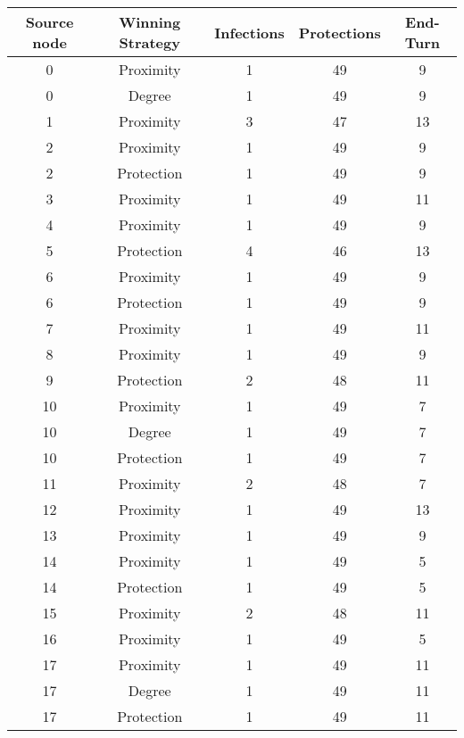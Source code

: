 \documentclass[results.tex]{subfiles}
\begin{document}
\begin{center}
  \begin{tabular}{| c || c | c | c | c |}
    \hline
    {\bfseries Source node} & {\bfseries Winning Strategy} & {\bfseries Infections} & {\bfseries Protections} & {\bfseries End-Turn} \\  %
    \hline\hline
    0 & Proximity & 1 & 49 & 9 \\ 
    \hline
    0 & Degree & 1 & 49 & 9 \\ 
    \hline
    1 & Proximity & 3 & 47 & 13 \\ 
    \hline
    2 & Proximity & 1 & 49 & 9 \\ 
    \hline
    2 & Protection & 1 & 49 & 9 \\ 
    \hline
    3 & Proximity & 1 & 49 & 11 \\ 
    \hline
    4 & Proximity & 1 & 49 & 9 \\ 
    \hline
    5 & Protection & 4 & 46 & 13 \\ 
    \hline
    6 & Proximity & 1 & 49 & 9 \\ 
    \hline
    6 & Protection & 1 & 49 & 9 \\ 
    \hline
    7 & Proximity & 1 & 49 & 11 \\ 
    \hline
    8 & Proximity & 1 & 49 & 9 \\ 
    \hline
    9 & Protection & 2 & 48 & 11 \\ 
    \hline
    10 & Proximity & 1 & 49 & 7 \\ 
    \hline
    10 & Degree & 1 & 49 & 7 \\ 
    \hline
    10 & Protection & 1 & 49 & 7 \\ 
    \hline
    11 & Proximity & 2 & 48 & 7 \\ 
    \hline
    12 & Proximity & 1 & 49 & 13 \\ 
    \hline
    13 & Proximity & 1 & 49 & 9 \\ 
    \hline
    14 & Proximity & 1 & 49 & 5 \\ 
    \hline
    14 & Protection & 1 & 49 & 5 \\ 
    \hline
    15 & Proximity & 2 & 48 & 11 \\ 
    \hline
    16 & Proximity & 1 & 49 & 5 \\ 
    \hline
    17 & Proximity & 1 & 49 & 11 \\ 
    \hline
    17 & Degree & 1 & 49 & 11 \\ 
    \hline
    17 & Protection & 1 & 49 & 11 \\ 
    \hline

\end{tabular}
\end{center}
\end{document}
